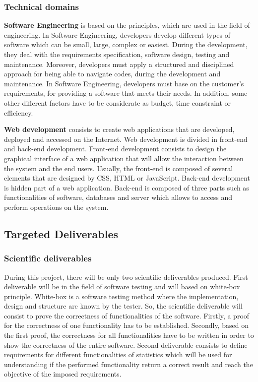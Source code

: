 \documentclass[conference,compsoc]{IEEEtran}
\begin{document}
\subsubsection{Technical domains} 
 
\textbf{Software Engineering} is based on the principles, which are used in the field of engineering. In Software Engineering, developers develop different types of software which can be small, large, complex or easiest. During the development, they deal with the requirements specification, software design, testing and maintenance. Moreover, developers must apply a structured and disciplined approach for being able to navigate codes, during the development and maintenance.                                   
In Software Engineering, developers must base on the customer's requirements, for providing a software that meets their needs. In addition, some other different factors have to be considerate as budget, time constraint or efficiency.

\textbf{Web development} consists to create web applications that are developed, deployed and accessed on the Internet. Web development is divided in front-end and back-end development.                                    
Front-end development consists to design the graphical interface of a web application that will allow the interaction between the system and the end users. Usually, the front-end is composed of several elements that are designed by CSS, HTML or JavaScript.                                                                                           
Back-end development is hidden part of a web application. Back-end is composed of three parts such as functionalities of software, databases and server which allows to access and perform operations on the system.

\subsection{Targeted Deliverables}
\label{sec-deliverables}
\subsubsection{Scientific deliverables}

During this project, there will be only two scientific deliverables produced.                                                     First deliverable will be in the field of software testing and will based on white-box principle. White-box is a software testing method where the implementation, design and structure are known by the tester.  
So, the scientific deliverable will consist to prove the correctness of functionalities of the software. 
Firstly, a proof for the correctness of one functionality has to be established. Secondly, based on the first proof, the correctness for all functionalities have to be written in order to show the correctness of the entire software. 
Second deliverable consists to define requirements for different functionalities of statistics which will be used for understanding if the performed functionality return a correct result and reach the objective of the imposed requirements. 
\end{document}
